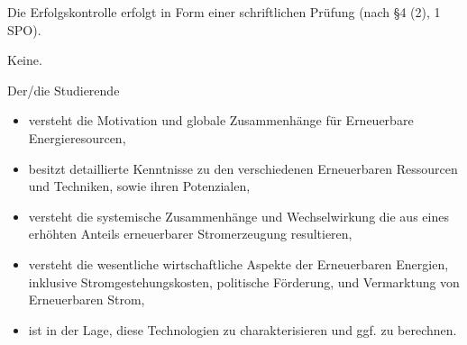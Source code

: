 \begin{course}

\setdoclanguagegerman
{}



\coursehead


\label{cour_7417.dp_997}


\begin{styleenv}
\begin{assessment}
Die Erfolgskontrolle erfolgt in Form einer schriftlichen Prüfung (nach §4 (2), 1 SPO).


\end{assessment}

\begin{conditions}Keine.\end{conditions}


\end{styleenv}

\begin{learningoutcomes}
Der/die Studierende

 \begin{itemize}\item versteht die Motivation und globale Zusammenhänge für Erneuerbare Energieresourcen,  \item besitzt detaillierte Kenntnisse zu den verschiedenen Erneuerbaren Ressourcen und Techniken, sowie ihren Potenzialen,  \item versteht die systemische Zusammenhänge und Wechselwirkung die aus eines erhöhten Anteils erneuerbarer Stromerzeugung resultieren,  \item versteht die wesentliche wirtschaftliche Aspekte der Erneuerbaren Energien, inklusive Stromgestehungskosten, politische Förderung, und Vermarktung von Erneuerbaren Strom,  \item ist in der Lage, diese Technologien zu charakterisieren und ggf. zu berechnen.  \end{itemize}
\end{learningoutcomes}


\end{course}
